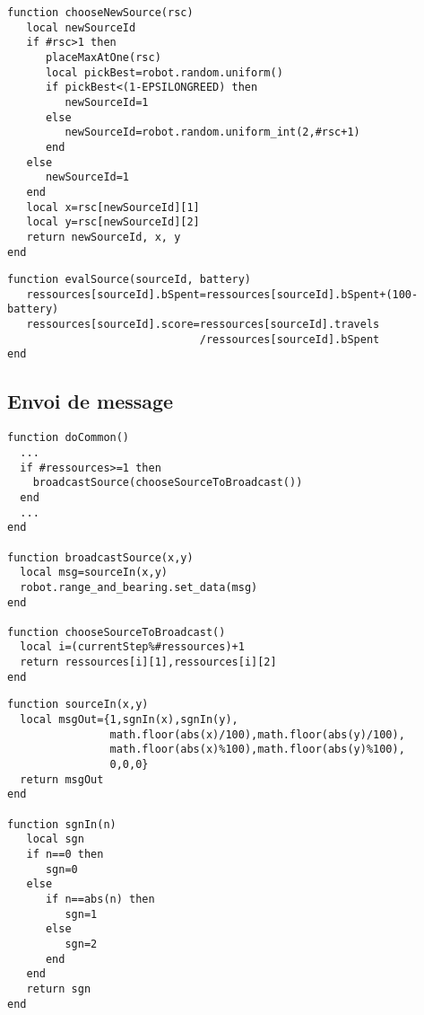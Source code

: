 \begin{subappendices}
\begin{lstlisting}[caption=Choix de la ressource à exploiter]
function chooseNewSource(rsc)
   local newSourceId
   if #rsc>1 then
      placeMaxAtOne(rsc)
      local pickBest=robot.random.uniform()
      if pickBest<(1-EPSILONGREED) then
         newSourceId=1
      else
         newSourceId=robot.random.uniform_int(2,#rsc+1)
      end
   else
      newSourceId=1
   end
   local x=rsc[newSourceId][1]
   local y=rsc[newSourceId][2]
   return newSourceId, x, y
end
\end{lstlisting}

\begin{lstlisting}[caption=Evaluation de la qualité de la source]
function evalSource(sourceId, battery)
   ressources[sourceId].bSpent=ressources[sourceId].bSpent+(100-battery)
   ressources[sourceId].score=ressources[sourceId].travels
                              /ressources[sourceId].bSpent
end
\end{lstlisting}


\subsection{Envoi de message}

\begin{lstlisting}[caption=Envoi d'un message différent à chaque pas]
function doCommon()
  ...
  if #ressources>=1 then
    broadcastSource(chooseSourceToBroadcast())
  end
  ...
end

function broadcastSource(x,y)
  local msg=sourceIn(x,y)
  robot.range_and_bearing.set_data(msg)
end

function chooseSourceToBroadcast()
  local i=(currentStep%#ressources)+1
  return ressources[i][1],ressources[i][2]
end
\end{lstlisting}

\begin{lstlisting}[caption=Encodage du message]
function sourceIn(x,y)
  local msgOut={1,sgnIn(x),sgnIn(y),
                math.floor(abs(x)/100),math.floor(abs(y)/100),
                math.floor(abs(x)%100),math.floor(abs(y)%100),
                0,0,0}
  return msgOut
end

function sgnIn(n)
   local sgn
   if n==0 then
      sgn=0
   else
      if n==abs(n) then
         sgn=1
      else
         sgn=2
      end
   end
   return sgn
end
\end{lstlisting}



\end{subappendices}
